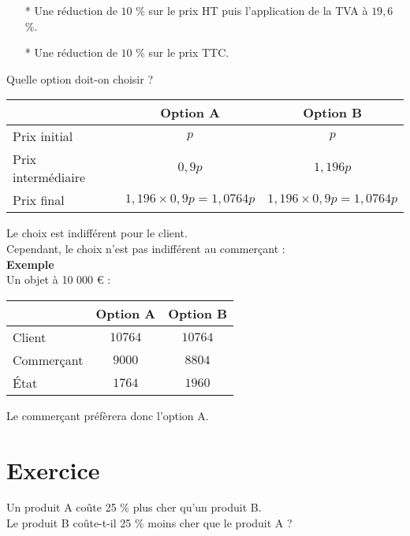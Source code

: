 \begin{enumerate}
\item[*] Une réduction de $10$ \% sur le prix HT puis l'application de la TVA à $19,6$ \%.
\item[*] Une réduction de $10$ \% sur le prix TTC.
\end{enumerate}

Quelle option doit-on choisir ? \\

\begin{tabular}{l|c|c}
& Option A & Option B \\
\hline
Prix initial & $p$ & $p$ \\
Prix intermédiaire & $0,9p$ & $1,196p$ \\
Prix final & $1,196 \times 0,9p = 1,0764p $ & $1,196 \times 0,9p = 1,0764p $ \\
\end{tabular} 

\vspace*{.3cm}

Le choix est indifférent pour le client. \\

Cependant, le choix n'est pas indifférent au commerçant : \\

\textbf{Exemple} \\

Un objet à 10 000 € : \\

\begin{tabular}{l|c|c}
& Option A & Option B \\
\hline
Client & $10764$ & $10764$ \\
Commerçant & $9000$ & $8804$ \\
État & $1764$ & $1960$ \\
\end{tabular} 

\vspace*{.3cm}

Le commerçant préfèrera donc l'option A.

\newpage

\section{Exercice }

Un produit A coûte 25 \% plus cher qu'un produit B. \\

Le produit B coûte-t-il 25 \% moins cher que le produit A ? \\

